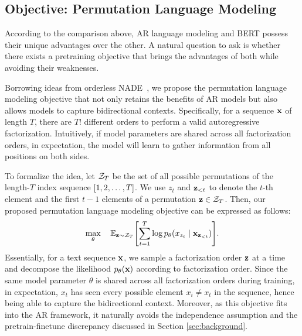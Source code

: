 

\subsection{Objective: Permutation Language Modeling}
\label{sec:objective}

According to the comparison above, AR language modeling and BERT possess their unique advantages over the other.
A natural question to ask is whether there exists a pretraining objective that brings the advantages of both while avoiding their weaknesses.

Borrowing ideas from orderless NADE~\cite{uria2016neural}, we propose the permutation language modeling objective that not only retains the benefits of AR models but also allows models to capture bidirectional contexts.
Specifically, for a sequence ${\mathbf{x}}$ of length $T$, there are $T!$ different orders to perform a valid autoregressive factorization.
Intuitively, if model parameters are shared across all factorization orders, in expectation, the model will learn to gather information from all positions on both sides.

To formalize the idea, let $\mathcal{Z}_T$ be the set of all possible permutations of the length-$T$ index sequence $\left[ {1, 2, \dots, T} \right]$.
We use $z_t$ and ${\mathbf{z}}_{<t}$ to denote the $t$-th element and the first $t-1$ elements of a permutation ${\mathbf{z}} \in \mathcal{Z}_T$.
Then, our proposed permutation language modeling objective can be expressed as follows:
\begin{equation}
\label{eqn:plm}
\max_{\theta}\quad \mbb{E}_{\rvz \sim \mc{Z}_T} \sbr{ \sum_{t=1}^{T} \log p_\theta(x_{z_t} \mid \rvx_{\rvz_{<t}}) }.
\end{equation}
Essentially, for a text sequence ${\mathbf{x}}$, we sample a factorization order ${\mathbf{z}}$ at a time and decompose the likelihood $p_\theta({\mathbf{x}})$ according to factorization order.
Since the same model parameter $\theta$ is shared across all factorization orders during training, in expectation, $x_t$ has seen every possible element $x_i \neq x_t$ in the sequence, hence being able to capture the bidirectional context. Moreover, as this objective fits into the AR framework, it naturally avoids the independence assumption and the pretrain-finetune discrepancy discussed in Section \ref{sec:background}.


